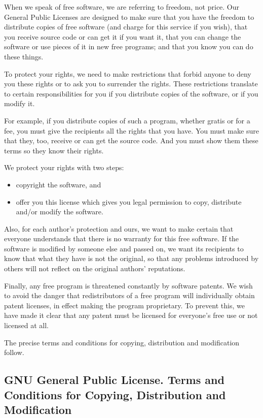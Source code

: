 When we speak of free software, we are referring to freedom, not
price.  Our General Public Licenses are designed to make sure that you
have the freedom to distribute copies of free software (and charge for
this service if you wish), that you receive source code or can get it
if you want it, that you can change the software or use pieces of it
in new free programs; and that you know you can do these things.

To protect your rights, we need to make restrictions that forbid
anyone to deny you these rights or to ask you to surrender the rights.
These restrictions translate to certain responsibilities for you if
you distribute copies of the software, or if you modify it.

For example, if you distribute copies of such a program, whether
gratis or for a fee, you must give the recipients all the rights that
you have.  You must make sure that they, too, receive or can get the
source code.  And you must show them these terms so they know their
rights.

We protect your rights with two steps: 

\begin{itemize}
\item  copyright the software, and
\item offer you this license which gives you legal permission to copy,
distribute and/or modify the software.
\end{itemize}

Also, for each author's protection and ours, we want to make certain
that everyone understands that there is no warranty for this free
software.  If the software is modified by someone else and passed on,
we want its recipients to know that what they have is not the
original, so that any problems introduced by others will not reflect
on the original authors' reputations.

Finally, any free program is threatened constantly by software
patents.  We wish to avoid the danger that redistributors of a free
program will individually obtain patent licenses, in effect making the
program proprietary.  To prevent this, we have made it clear that any
patent must be licensed for everyone's free use or not licensed at
all.

The precise terms and conditions for copying, distribution and
modification follow.

\subsection{GNU General Public License.
   Terms and Conditions for Copying, Distribution and Modification}


